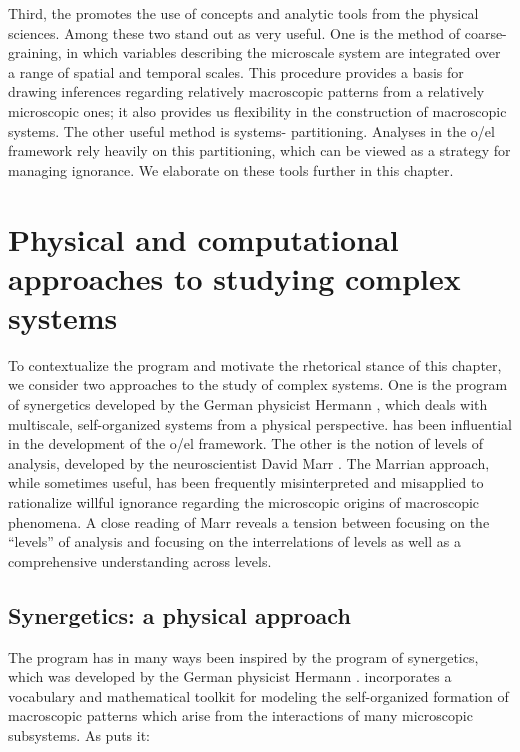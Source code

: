   Third, the  promotes the use of concepts and analytic tools from the physical sciences. Among these two stand out as very useful. One is the method of coarse-graining, in which variables describing the microscale system are integrated over a range of spatial and temporal scales. This procedure provides a basis for drawing inferences regarding relatively macroscopic patterns from a relatively microscopic ones; it also provides us flexibility in the construction of macroscopic systems. The other useful method is systems- partitioning. Analyses in the o/el framework rely heavily on this partitioning, which can be viewed as a strategy for managing ignorance. We elaborate on these tools further in this chapter.

\section{Physical and computational approaches to studying complex systems}

To contextualize the  program and motivate the rhetorical stance of this chapter, we consider two approaches to the study of complex systems. One is the program of synergetics developed by the German physicist Hermann  \citep{Haken1973,Haken1983b,Haken1983a}, which deals with multiscale, self-organized systems from a physical perspective.  has been influential in the development of the o/el framework. The other is the notion of levels of analysis, developed by the neuroscientist David Marr \citep{MarrPoggio1977,Marr1982}. The Marrian approach, while sometimes useful, has been frequently misinterpreted and misapplied to rationalize willful ignorance regarding the microscopic origins of macroscopic phenomena. A close reading of Marr reveals a tension between focusing on the “levels” of analysis and focusing on the interrelations of levels as well as a comprehensive understanding across levels.

\subsection{Synergetics: a physical approach}

The  program has in many ways been inspired by the program of synergetics, which was developed by the German physicist Hermann  \citep{Haken1973,Haken1983b,Haken1983a}.  incorporates a vocabulary and mathematical toolkit for modeling the self-organized formation of macroscopic patterns which arise from the interactions of many microscopic subsystems. As \citet{Haken1973} puts it:

